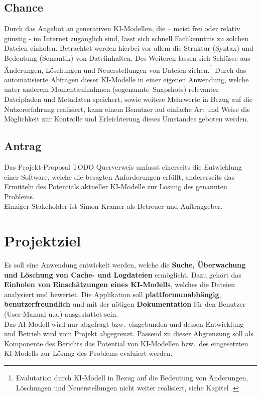 \documentclass[a4paper,12pt]{report}
\begin{document}
    \subsection{Chance}\label{subsec:chance}
    Durch das Angebot an generativen KI-Modellen, die – meist frei oder relativ günstig - im
    Internet zugänglich sind, lässt sich schnell Fachkenntnis zu solchen Dateien einholen.
    Betrachtet werden hierbei vor allem die Struktur (Syntax) und Bedeutung (Semantik) von Dateiinhalten.
    Des Weiteren lassen sich Schlüsse aus Änderungen, Löschungen und Neuerstellungen von Dateien ziehen.\footnote{Evalutation durch KI-Modell in Bezug auf die Bedeutung von Änderungen, Löschungen und Neuerstellungen nicht weiter realisiert, siehe Kapitel .}
    Durch das automatisierte Abfragen dieser KI-Modelle in einer eigenen Anwendung,
    welche unter anderem Momentaufnahmen (sogenannte\ Snapshots) relevanter Dateipfaden und Metadaten speichert,
    sowie weitere Mehrwerte in Bezug auf die Nutzererfahrung realisiert, kann einem
    Benutzer auf einfache Art und Weise die Möglichkeit zur Kontrolle und Erleichterung dieses Umstandes
    geboten werden.

    \subsection{Antrag}\label{subsec:stakeholder}
    Das Projekt-Proposal TODO Querverweis umfasst einerseits die Entwicklung einer Software, welche die besagten Anforderungen erfüllt,
    andererseits das Ermitteln des Potentials aktueller KI-Modelle zur Lösung des genannten Problems.\\
    Einziger Stakeholder ist Simon Kramer als Betreuer und Auftraggeber.\\


    \section{Projektziel}\label{sec:projektziel}
    Es soll eine Anwendung entwickelt werden, welche die \textbf{Suche, Überwachung und Löschung von Cache- und Logdateien} ermöglicht.
    Dazu gehört das \textbf{Einholen von Einschätzungen eines KI-Modells}, welches die Dateien analysiert und bewertet.
    Die Applikation soll \textbf{plattformunabhängig}, \textbf{benutzerfreundlich} und mit der nötigen \textbf{Dokumentation} für den Benutzer (User-Manual u.a.) ausgestattet sein.
    \\Das AI-Modell wird nur abgefragt bzw.\ eingebunden und dessen Entwicklung und Betrieb
    wird vom Projekt abgegrenzt.
    Passend zu dieser Abgrenzung soll als Komponente des Berichts das Potential von KI-Modellen bzw.\ des eingesetzten KI-Modells zur Lösung des Problems evaluiert werden.
\end{document}
